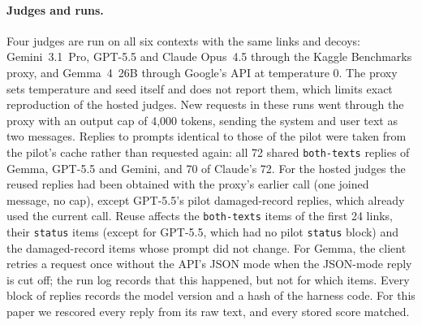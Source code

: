 \paragraph{Judges and runs.}
Four judges are run on all six contexts with the same links and decoys: Gemini~3.1~Pro, GPT-5.5 and Claude
Opus~4.5 through the Kaggle Benchmarks proxy, and Gemma~4~26B through Google's API at temperature 0. The proxy sets
temperature and seed itself and does not report them, which limits exact reproduction of the hosted judges. New requests in these runs went through the proxy with an output cap of 4,000 tokens, sending the system and
user text as two messages. Replies to prompts identical to those of the pilot were taken from the pilot's cache rather
than requested again: all 72 shared \texttt{both-texts} replies of Gemma, GPT-5.5 and Gemini, and 70 of Claude's 72. For the
hosted judges the reused replies had been obtained with the proxy's earlier call (one joined message, no cap), except
GPT-5.5's pilot damaged-record replies, which already used the current call. Reuse
affects the \texttt{both-texts} items of the first 24 links, their \texttt{status} items (except for GPT-5.5, which
had no pilot \texttt{status} block) and the damaged-record items whose
prompt did not change. For Gemma, the client retries a request once without the API's JSON mode when the
JSON-mode reply is cut off; the run log records that this happened, but not for which items. Every block of replies
records the model version and a hash of the harness code. For this paper we rescored every reply from its raw text, and
every stored score matched.

